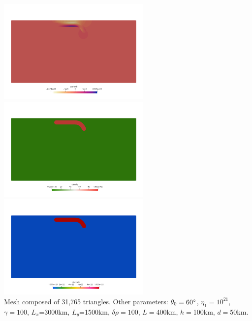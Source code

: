 \begin{center}
\includegraphics[width=7.5cm]{python_codes/fieldstone_55/images/press}\\
\includegraphics[width=7.5cm]{python_codes/fieldstone_55/images/rho}
\includegraphics[width=7.5cm]{python_codes/fieldstone_55/images/eta}\\
{\scriptsize Mesh composed of 31,765 triangles.
Other parameters: $\theta_0=60\degree$, $\eta_1=10^{21}$, $\gamma=100$, 
$L_x$=3000km, $L_y$=1500km, $\delta\rho=100$, $L=$400km, $h=$100km, $d=$50km.}
\end{center}



